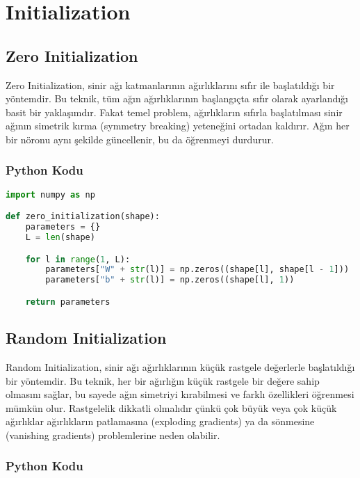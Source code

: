 \section{Initialization}

\subsection{Zero Initialization}
Zero Initialization, sinir ağı katmanlarının ağırlıklarını sıfır ile başlatıldığı bir yöntemdir. Bu teknik, tüm ağın ağırlıklarının başlangıçta sıfır olarak ayarlandığı basit bir yaklaşımdır. Fakat temel problem, ağırlıkların sıfırla başlatılması sinir ağının simetrik kırma (symmetry breaking) yeteneğini ortadan kaldırır. Ağın her bir nöronu aynı şekilde güncellenir, bu da öğrenmeyi durdurur.

\subsubsection{Python Kodu}

\begin{lstlisting}[language=Python]
import numpy as np

def zero_initialization(shape):
    parameters = {}
    L = len(shape)

    for l in range(1, L):
        parameters["W" + str(l)] = np.zeros((shape[l], shape[l - 1]))
        parameters["b" + str(l)] = np.zeros((shape[l], 1))

    return parameters
\end{lstlisting}

\newpage

\subsection{Random Initialization}
Random Initialization, sinir ağı ağırlıklarının küçük rastgele değerlerle başlatıldığı bir yöntemdir. Bu teknik, her bir ağırlığın küçük rastgele bir değere sahip olmasını sağlar, bu sayede ağın simetriyi kırabilmesi ve farklı özellikleri öğrenmesi mümkün olur. Rastgelelik dikkatli olmalıdır çünkü çok büyük veya çok küçük ağırlıklar ağırlıkların patlamasına (exploding gradients) ya da sönmesine (vanishing gradients) problemlerine neden olabilir.

\subsubsection{Python Kodu}

